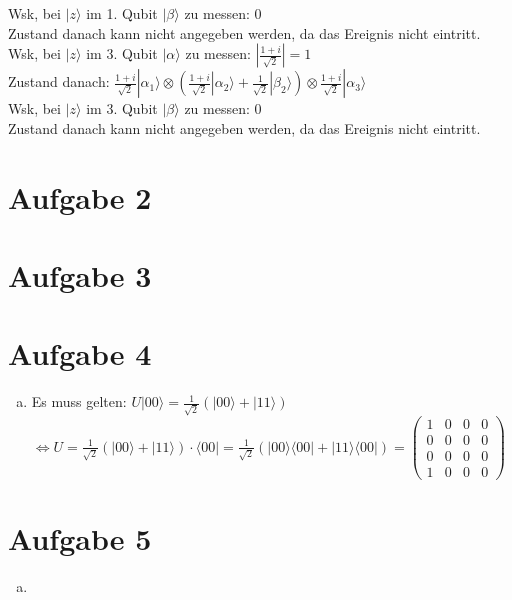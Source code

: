\documentclass[a4paper]{scrartcl}
\begin{document}
Wsk, bei $|z\rangle$ im 1. Qubit $|\beta\rangle$ zu messen: $0$\\
Zustand danach kann nicht angegeben werden, da das Ereignis nicht eintritt.\\

Wsk, bei $|z\rangle$ im 3. Qubit $|\alpha\rangle$ zu messen: $|\frac{1+i}{\sqrt{2}}| = 1$\\
Zustand danach: $\frac{1+i}{\sqrt{2}} |\alpha_1\rangle \otimes (\frac{1+i}{\sqrt{2}} |\alpha_2\rangle + \frac{1}{\sqrt{2}} |\beta_2\rangle) \otimes \frac{1+i}{\sqrt{2}} |\alpha_3\rangle $\\

Wsk, bei $|z\rangle$ im 3. Qubit $|\beta\rangle$ zu messen: $0$\\
Zustand danach kann nicht angegeben werden, da das Ereignis nicht eintritt.\\
\newpage
\section*{Aufgabe 2}


\newpage
\section*{Aufgabe 3}


\newpage
\section*{Aufgabe 4}
\begin{enumerate}[a)]

\item Es muss gelten: $U |00\rangle=\frac{1}{\sqrt{2}}(|00\rangle + |11\rangle )$\\
$\Leftrightarrow U = \frac{1}{\sqrt{2}}(|00 \rangle + |11\rangle)\cdot \langle 00|= \frac{1}{\sqrt{2}}(|00\rangle \langle 00|+|11\rangle \langle 00|)= \begin{pmatrix}
1&0&0&0\\
0&0&0&0\\
0&0&0&0\\
1&0&0&0
\end{pmatrix}$
\end{enumerate}
\newpage
\section*{Aufgabe 5}
\begin{enumerate}[a)]

\item
\end{enumerate}
\end{document}

